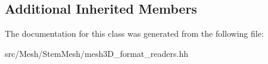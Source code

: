 \subsection*{Additional Inherited Members}


The documentation for this class was generated from the following file\+:\begin{DoxyCompactItemize}
\item 
src/\+Mesh/\+Stem\+Mesh/mesh3\+D\+\_\+format\+\_\+readers.\+hh\end{DoxyCompactItemize}
